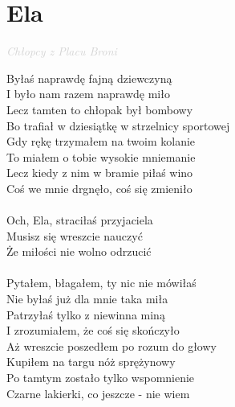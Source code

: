 \documentclass[a5paper, 10pt]{book}
\begin{document}
\newpage
\section{Ela}\textcolor{lightgray}{\textit{Chłopcy z Placu Broni}}\vspace*{2mm}\\
\begin{minipage}[t]{0.8\textwidth}
Byłaś naprawdę fajną dziewczyną\\
I było nam razem naprawdę miło\\
Lecz tamten to chłopak był bombowy\\
Bo trafiał w dziesiątkę w strzelnicy sportowej\vspace*{2mm}
\\
Gdy rękę trzymałem na twoim kolanie\\
To miałem o tobie wysokie mniemanie\\
Lecz kiedy z nim w bramie piłaś wino\\
Coś we mnie drgnęło, coś się zmieniło\\
\\
\hspace*{5mm}Och, Ela, straciłaś przyjaciela\\
\hspace*{5mm}Musisz się wreszcie nauczyć\\
\hspace*{5mm}Że miłości nie wolno odrzucić\\
\\
Pytałem, błagałem, ty nic nie mówiłaś\\
Nie byłaś już dla mnie taka miła\\
Patrzyłaś tylko z niewinna miną\\
I zrozumiałem, że coś się skończyło\vspace*{2mm}
\\
Aż wreszcie poszedłem po rozum do głowy\\
Kupiłem na targu nóż sprężynowy\\
Po tamtym zostało tylko wspomnienie\\
Czarne lakierki, co jeszcze - nie wiem\\
\end{minipage}
\end{document}

